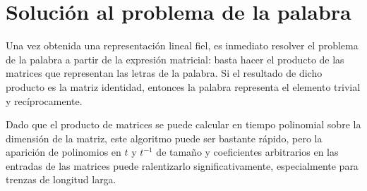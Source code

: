 \documentclass[TFG.tex]{subfiles}
\begin{document}

\section{Solución al problema de la palabra}
Una vez obtenida una representación lineal fiel, es inmediato resolver el problema de la palabra a partir de la expresión matricial: basta hacer el producto de las matrices que representan las letras de la palabra. Si el resultado de dicho producto es la matriz identidad, entonces la palabra representa el elemento trivial y recíprocamente.

Dado que el producto de matrices se puede calcular en tiempo polinomial sobre la dimensión de la matriz, este algoritmo puede ser bastante rápido, pero la aparición de polinomios en $t$ y $t^{-1}$ de tamaño y coeficientes arbitrarios en las entradas de las matrices puede ralentizarlo significativamente, especialmente para trenzas de longitud larga.
\end{document}
